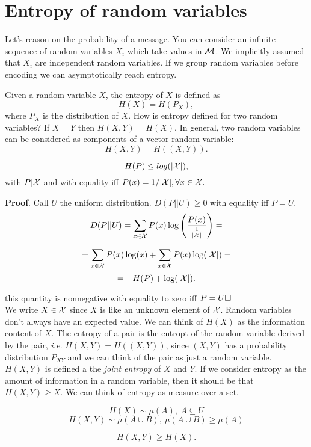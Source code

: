 \chapter{Entropy of random variables}

Let's reason on the probability of a message. You can consider an infinite sequence of random variables $X_i$ which take values in $\mathcal{M}$. We implicitly assumed that $X_i$ are independent random variables. If we group random variables before encoding we can asymptotically reach entropy.

Given a random variable $X$, the entropy of $X$ is defined as $$H(X) = H(P_X),$$ where $P_X$ is the distribution of $X$. How is entropy defined for two random variables? If $X=Y$ then $H(X, Y) = H(X).$ In general, two random variables can be considered as components of a vector random variable: $$H(X, Y) = H((X, Y)).$$

\begin{prop}
 $$H(P) \leq log(|\mathcal{X}|),$$ with $P|\mathcal{X}$ and with equality iff $P(x) = {1}/{|\mathcal{X}|}, \forall x \in \mathcal{X}.$
\end{prop}
\noindent\textbf{Proof}. Call $U$ the uniform distribution. $D(P||U)\geq 0$ with equality iff $P = U$.
\[
 D(P||U) = \sum_{x \in \mathcal{X}} P(x)\log\left(\dfrac{P(x)}{\frac{1}{|\mathcal{X}|}}\right) =
\]

\[
 = \sum_{x \in \mathcal{X}} P(x)\log(x) + \sum_{x\in\mathcal{X}} P(x)\log(|\mathcal{X}|) =
\]
\[
 = -H(P) + \log(|\mathcal{X}|).
\]

this quantity is nonnegative with equality to zero iff $P=U \hfill\Box$\\

We write $X \in \mathcal{X}$ since $X$ is like an unknown element of $\mathcal{X}$. Random variables don't always have an expected value. We can think of $H(X)$ as the information content of $X$. The entropy of a pair is the entropt of the random variable derived by the pair, \emph{i.e.} $H(X, Y) = H((X, Y))$, since $(X, Y)$ has a probability distribution $P_{XY}$ and we can think of the pair as just a random variable. $H(X, Y)$ is defined a the \emph{joint entropy} of $X$ and $Y$. If we consider entropy as the amount of information in a random variable, then it should be that $H(X, Y) \geq X$. We can think of entropy as  measure over a set.

\[
 H(X) \sim \mu(A),\ A \subseteq U
\]
\[
H(X, Y) \sim \mu(A \cup B),\ \mu(A \cup B) \geq \mu(A)
\]

\begin{prop}
  $$H(X, Y) \geq H(X).$$
\end{prop}

